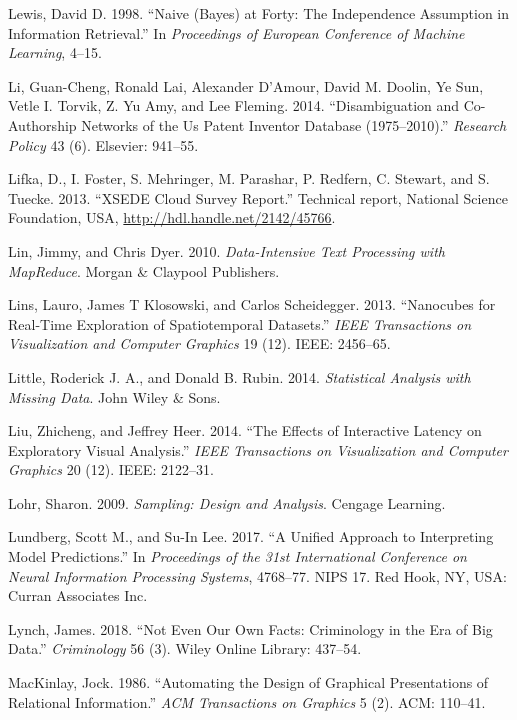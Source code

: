 \documentclass[]{krantz}
\begin{document}
\hypertarget{ref-lewis-05}{}
Lewis, David D. 1998. ``Naive (Bayes) at Forty: The Independence
Assumption in Information Retrieval.'' In \emph{Proceedings of European
Conference of Machine Learning}, 4--15.

\hypertarget{ref-li2014disambiguation}{}
Li, Guan-Cheng, Ronald Lai, Alexander D'Amour, David M. Doolin, Ye Sun,
Vetle I. Torvik, Z. Yu Amy, and Lee Fleming. 2014. ``Disambiguation and
Co-Authorship Networks of the Us Patent Inventor Database
(1975--2010).'' \emph{Research Policy} 43 (6). Elsevier: 941--55.

\hypertarget{ref-Lifka}{}
Lifka, D., I. Foster, S. Mehringer, M. Parashar, P. Redfern, C. Stewart,
and S. Tuecke. 2013. ``XSEDE Cloud Survey Report.'' Technical report,
National Science Foundation, USA,
\url{http://hdl.handle.net/2142/45766}.

\hypertarget{ref-lin2010data}{}
Lin, Jimmy, and Chris Dyer. 2010. \emph{Data-Intensive Text Processing
with MapReduce}. Morgan \& Claypool Publishers.

\hypertarget{ref-lins2013nanocubes}{}
Lins, Lauro, James T Klosowski, and Carlos Scheidegger. 2013.
``Nanocubes for Real-Time Exploration of Spatiotemporal Datasets.''
\emph{IEEE Transactions on Visualization and Computer Graphics} 19 (12).
IEEE: 2456--65.

\hypertarget{ref-little2014statistical}{}
Little, Roderick J. A., and Donald B. Rubin. 2014. \emph{Statistical
Analysis with Missing Data}. John Wiley \& Sons.

\hypertarget{ref-liu2014effects}{}
Liu, Zhicheng, and Jeffrey Heer. 2014. ``The Effects of Interactive
Latency on Exploratory Visual Analysis.'' \emph{IEEE Transactions on
Visualization and Computer Graphics} 20 (12). IEEE: 2122--31.

\hypertarget{ref-lohr2009sampling}{}
Lohr, Sharon. 2009. \emph{Sampling: Design and Analysis}. Cengage
Learning.

\hypertarget{ref-Lundberg2017}{}
Lundberg, Scott M., and Su-In Lee. 2017. ``A Unified Approach to
Interpreting Model Predictions.'' In \emph{Proceedings of the 31st
International Conference on Neural Information Processing Systems},
4768--77. NIPS 17. Red Hook, NY, USA: Curran Associates Inc.

\hypertarget{ref-lynch2018}{}
Lynch, James. 2018. ``Not Even Our Own Facts: Criminology in the Era of
Big Data.'' \emph{Criminology} 56 (3). Wiley Online Library: 437--54.

\hypertarget{ref-mackinlay1986automating}{}
MacKinlay, Jock. 1986. ``Automating the Design of Graphical
Presentations of Relational Information.'' \emph{ACM Transactions on
Graphics} 5 (2). ACM: 110--41.
\end{document}
